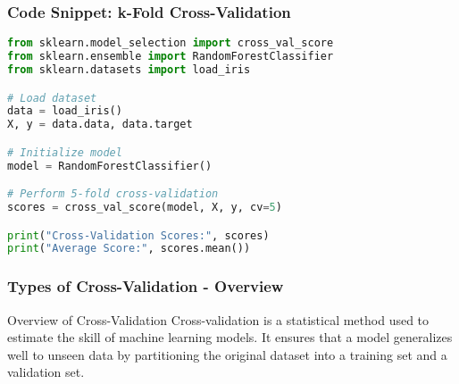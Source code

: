 \documentclass[aspectratio=169]{beamer}
\begin{document}
\begin{frame}[fragile]
    \frametitle{Code Snippet: k-Fold Cross-Validation}
    \begin{lstlisting}[language=Python]
from sklearn.model_selection import cross_val_score
from sklearn.ensemble import RandomForestClassifier
from sklearn.datasets import load_iris

# Load dataset
data = load_iris()
X, y = data.data, data.target

# Initialize model
model = RandomForestClassifier()

# Perform 5-fold cross-validation
scores = cross_val_score(model, X, y, cv=5)

print("Cross-Validation Scores:", scores)
print("Average Score:", scores.mean())
    \end{lstlisting}
\end{frame}

\begin{frame}[fragile]
    \frametitle{Types of Cross-Validation - Overview}
    \begin{block}{Overview of Cross-Validation}
        Cross-validation is a statistical method used to estimate the skill of machine learning models. 
        It ensures that a model generalizes well to unseen data by partitioning the original dataset into a training set and a validation set.
    \end{block}
\end{frame}
\end{document}
